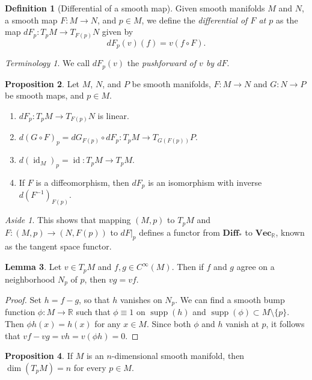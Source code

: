 \documentclass[10pt,letterpaper,cm]{nupset}
\theoremstyle{definition}
\newtheorem{definition}{Definition}[subsection]
\theoremstyle{theorem}
\newtheorem{lemma}[definition]{Lemma}
\newtheorem{prop}[definition]{Proposition}
\theoremstyle{remark}
\newtheorem*{aside}{Aside}
\newtheorem*{term}{Terminology}
\newcommand{\R}{\mathbb R}
\newcommand{\1}{\mathbf{1}}
\newcommand{\0}{\vec 0}
\DeclareMathOperator{\id}{id}
\DeclareMathOperator{\supp}{supp}
\begin{document}
\begin{definition}[Differential of a smooth map]
Given smooth manifolds $M$ and $N$, a smooth map $F: M \to N$, and $p\in M$,  we define the \textit{differential of $F$ at $p$} as the map $dF_p: T_pM \to T_{F(p)}N$ given by $$dF_p(v)(f) = v(f \circ F).$$
\end{definition}

\begin{term}
We call $dF_p(v)$ the \textit{pushforward of $v$ by $dF$}.
\end{term}

\begin{prop}
Let $M$, $N$, and $P$ be  smooth manifolds, $F: M \to N$ and $G: N \to P$ be smooth maps, and $p\in M$. 
\begin{enumerate}
\item $dF_p: T_pM \to T_{F(p)}N$ is linear. 
\item $d(G \circ F)_p = dG_{F(p)} \circ dF_p : T_pM \to T_{G(F(p))}P$.
\item $d(\id_M)_p = \id : T_pM \to T_pM$.
\item If $F$ is a diffeomorphism, then $dF_p$ is an isomorphism with inverse $d(F^{-1})_{F(p)}$.
\end{enumerate}
\end{prop}

\begin{aside}
This shows that mapping $(M, p)$ to $T_pM$ and $F: (M, p) \to \left(N, F(p)\right)$ to $dF\bigr\rvert_p$ defines a functor from $\mathbf{Diff}_{\ast}$ to $\mathbf{Vec}_{\R}$, known as the tangent space functor.
\end{aside}

\begin{lemma}
Let $v \in T_pM$ and $f, g\in C^{\infty}(M)$. Then if $f$ and $g$ agree on a neighborhood $N_p$ of $p$, then $vg = vf$. 
\end{lemma}
\begin{proof}
Set $h = f-g$, so that $h$ vanishes on $N_p$. We can find a smooth bump function $\phi: M \to \R$ such that $\phi \equiv 1$ on $\supp(h)$ and $\supp(\phi) \subset M \setminus \{p\}$. Then $\phi h(x) = h(x)$ for any $x\in M$. Since both $\phi$ and $h$ vanish at $p$, it follows that $vf -vg = vh = v(\phi h) = 0.$
\end{proof}

\begin{prop}
If $M$ is an $n$-dimensional smooth manifold, then $\dim(T_pM) =n$ for every $p\in M$.
\end{prop}
\end{document}
